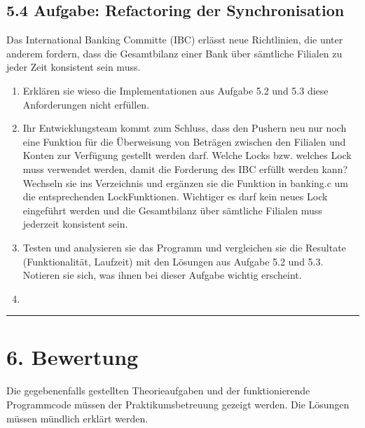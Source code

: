 \documentclass[a4paper,10pt,english]{report}
\begin{document}
\subsection{5.4	Aufgabe: Refactoring der Synchronisation}
\label{\detokenize{P08_Sync/README:aufgabe-refactoring-der-synchronisation}}
\sphinxAtStartPar
Das International Banking Committe (IBC) erlässt neue Richtlinien, die unter anderem fordern, dass die Gesamtbilanz einer Bank über sämtliche Filialen zu jeder Zeit konsistent sein muss.
\begin{enumerate}
%
\item {} 
\sphinxAtStartPar
Erklären sie wieso die Implementationen aus Aufgabe 5.2 und 5.3 diese Anforderungen nicht erfüllen.

\item {} 
\sphinxAtStartPar
Ihr Entwicklungsteam kommt zum Schluss, dass den Pushern neu nur noch eine Funktion  für die Überweisung von Beträgen zwischen den Filialen und Konten zur Verfügung gestellt werden darf.
Welche Locks bzw. welches Lock muss verwendet werden, damit die Forderung des IBC erfüllt werden kann? Wechseln sie ins Verzeichnis  und ergänzen sie die Funktion  in banking.c um die entsprechenden Lock\sphinxhyphen{}Funktionen.
Wichtiger
 es darf kein neues Lock eingeführt werden und die Gesamtbilanz über sämtliche Filialen muss jederzeit konsistent sein.

\item {} 
\sphinxAtStartPar
Testen und analysieren sie das Programm und vergleichen sie die Resultate (Funktionalität, Laufzeit) mit den Lösungen aus Aufgabe 5.2 und 5.3. Notieren sie sich, was ihnen bei dieser Aufgabe wichtig erscheint.

\item {} 
\end{enumerate}


\bigskip\hrule\bigskip



\section{6. Bewertung}
\label{\detokenize{P08_Sync/README:bewertung}}
\sphinxAtStartPar
Die gegebenenfalls gestellten Theorieaufgaben und der funktionierende Programmcode müssen der Praktikumsbetreuung gezeigt werden. Die Lösungen müssen mündlich erklärt werden.
\end{document}
